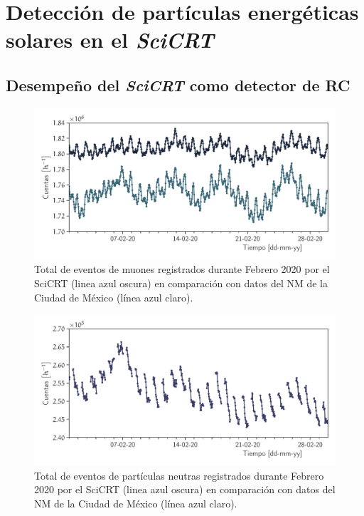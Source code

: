 
\chapter{Detección de partículas energéticas\\ solares en el \emph{SciCRT}}
\label{chap:cuatro}
\section{Desempeño del \emph{SciCRT} como detector de RC}

\begin{figure}
        \centering
        \includegraphics[width=\textwidth]{muon-monthly.pdf}
        \caption{Total de eventos de muones registrados durante Febrero \num{2020} por el SciCRT (linea azul oscura) en comparación con datos del NM de la Ciudad de México (línea azul claro).}
        \label{fig:muon-monthly}
\end{figure}

\begin{figure}
        \centering
        \includegraphics[width=\textwidth]{neutron-monthly.pdf}
        \caption{Total de eventos de partículas neutras registrados durante Febrero \num{2020} por el SciCRT (linea azul oscura) en comparación con datos del NM de la Ciudad de México (línea azul claro).}
        \label{fig:neutron-monthly}
\end{figure}

